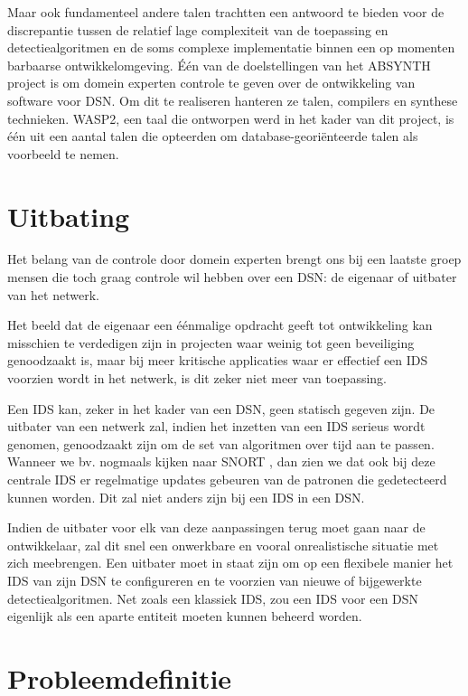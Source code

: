 Maar ook fundamenteel andere talen trachtten een antwoord te bieden voor de
discrepantie tussen de relatief lage complexiteit van de toepassing en
detectiealgoritmen en de soms complexe implementatie binnen een op momenten
barbaarse ontwikkelomgeving. \'E\'en van de doelstellingen van het ABSYNTH
project \citep{url:absynth} is om domein experten controle te geven over de
ontwikkeling van software voor DSN. Om dit te realiseren hanteren ze talen,
compilers en synthese technieken. WASP2, een taal die ontworpen werd in het
kader van dit project, is \'e\'en uit een aantal talen die opteerden om
database-geori\"enteerde talen als voorbeeld te nemen.

\section{Uitbating}
\label{section:problem-operations}

Het belang van de controle door domein experten brengt ons bij een laatste
groep mensen die toch graag controle wil hebben over een DSN: de eigenaar of
uitbater van het netwerk.

Het beeld dat de eigenaar een \'e\'enmalige opdracht geeft tot ontwikkeling kan
misschien te verdedigen zijn in projecten waar weinig tot geen beveiliging
genoodzaakt is, maar bij meer kritische applicaties waar er effectief een IDS
voorzien wordt in het netwerk, is dit zeker niet meer van toepassing.

Een IDS kan, zeker in het kader van een DSN, geen statisch gegeven zijn. De
uitbater van een netwerk zal, indien het inzetten van een IDS serieus wordt
genomen, genoodzaakt zijn om de set van algoritmen over tijd aan te passen.
Wanneer we bv. nogmaals kijken naar SNORT \citep{roesch1999snort}, dan zien we
dat ook bij deze centrale IDS er regelmatige updates gebeuren van de patronen
die gedetecteerd kunnen worden. Dit zal niet anders zijn bij een IDS in een DSN.

Indien de uitbater voor elk van deze aanpassingen terug moet gaan naar de
ontwikkelaar, zal dit snel een onwerkbare en vooral onrealistische situatie met
zich meebrengen. Een uitbater moet in staat zijn om op een flexibele manier het
IDS van zijn DSN te configureren en te voorzien van nieuwe of bijgewerkte
detectiealgoritmen. Net zoals een klassiek IDS, zou een IDS voor een DSN
eigenlijk als een aparte entiteit moeten kunnen beheerd worden.

\section{Probleemdefinitie}
\label{section:problem-definition}

